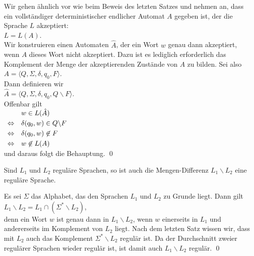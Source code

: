 \proof Wir gehen \"ahnlich vor wie beim Beweis des letzten Satzes und nehmen an, dass ein
vollst\"andiger deterministischer endlicher Automat $A$ gegeben ist, der die Sprache $L$
akzeptiert:
\\[0.2cm]
\hspace*{1.3cm} $L = L(A)$.
\\[0.2cm]
Wir konstruieren einen Automaten $\hat{A}$, der ein Wort $w$ genau dann akzeptiert, wenn
$A$ dieses Wort nicht akzeptiert.  Dazu ist es lediglich erforderlich das Komplement der
Menge der akzeptierenden Zust\"ande von $A$ zu bilden.  Sei also
\\[0.2cm]
\hspace*{1.3cm} $A = \langle Q, \Sigma, \delta, q_0, F \rangle$.
\\[0.2cm]
Dann definieren wir
\\[0.2cm]
\hspace*{1.3cm} $\hat{A} = \langle Q, \Sigma, \delta, q_0, Q \backslash F \rangle$.
\\[0.2cm]
Offenbar gilt
\\[0.2cm]
\hspace*{1.3cm} $\begin{array}[t]{cl}
  & w \in L(\hat{A})                      \\[0.1cm]
  \Leftrightarrow & \delta(q_0, w) \in Q \backslash F     \\[0.1cm]
  \Leftrightarrow & \delta(q_0, w) \not\in F \\[0.1cm]
  \Leftrightarrow & w \not\in L(A)
 \end{array}
$
\\[0.2cm]
und daraus folgt die Behauptung. \qed

\begin{Korollar} \label{kor:mengendif}
  Sind $L_1$ und $L_2$ regul\"are Sprachen, so ist auch die Mengen-Differenz $L_1 \backslash L_2$ 
  eine regul\"are Sprache.
\end{Korollar}

\proof
Es sei $\Sigma$ das Alphabet, das den Sprachen $L_1$ und $L_2$ zu Grunde liegt.  Dann gilt
\\[0.2cm]
\hspace*{1.3cm}
$L_1 \backslash L_2 = L_1 \cap (\Sigma^* \backslash L_2)$,
\\[0.2cm]
denn ein Wort $w$ ist genau dann in $L_1 \backslash L_2$, wenn $w$ einerseits in  $L_1$
und andererseits im Komplement von $L_2$ liegt.  Nach dem letzten Satz wissen wir, dass mit
$L_2$ auch das Komplement $\Sigma^* \backslash L_2$ regul\"ar ist.  Da der Durchschnitt
zweier regul\"arer Sprachen wieder regul\"ar ist, ist damit auch $L_1 \backslash L_2$ regul\"ar.
\qed
\vspace*{0.3cm}

